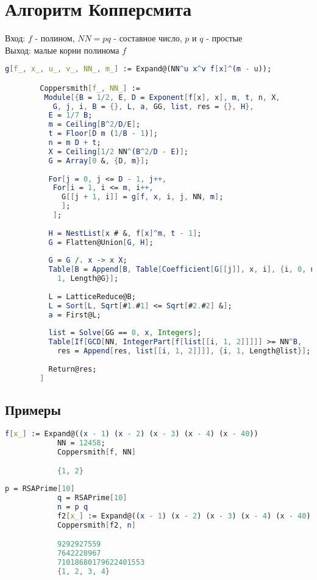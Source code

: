 	\section{Алгоритм Копперсмита}
		Вход: $f$ - полином, $NN=p q$ - составное число, $p$ и $q$ - простые \\
		Выход: малые корни полинома $f$

		\begin{lstlisting}[language=Mathematica,caption={
      		Алгоритм Копперсмита
    	}]
		g[f_, x_, u_, v_, NN_, m_] := Expand@(NN^u x^v f[x]^(m - u));

		Coppersmith[f_, NN_] := 
		 Module[{B = 1/2, E, D = Exponent[f[x], x], m, t, n, X, 
		   G, j, i, B = {}, L, a, GG, list, res = {}, H},
		  E = 1/7 B;
		  m = Ceiling[B^2/D/E];
		  t = Floor[D m (1/B - 1)];
		  n = m D + t;
		  X = Ceiling[1/2 NN^(B^2/D - E)];
		  G = Array[0 &, {D, m}];
		  
		  For[j = 0, j <= D - 1, j++,
		   For[i = 1, i <= m, i++,
		     G[[j + 1, i]] = g[f, x, i, j, NN, m];
		     ];
		   ];
		  
		  H = NestList[x # &, f[x]^m, t - 1];
		  G = Flatten@Union[G, H];
		  
		  G = G /. x -> x X;
		  Table[B = Append[B, Table[Coefficient[G[[j]], x, i], {i, 0, n - 1}]];, {j, 
		    1, Length@G}];
		  
		  L = LatticeReduce@B;
		  L = Sort[L, Sqrt[#1.#1] <= Sqrt[#2.#2] &];
		  a = First@L;
		  
		  list = Solve[GG == 0, x, Integers];
		  Table[If[GCD[NN, IntegerPart[f[list[[i, 1, 2]]]]] >= NN^B, 
		    res = Append[res, list[[i, 1, 2]]]], {i, 1, Length@list}];
		  
		  Return@res;
		]
    	\end{lstlisting}

    	\subsection{Примеры}

	    	\begin{lstlisting}[language=Mathematica,caption={
	      		Пример	1
	    	}]
			f[x_] := Expand@((x - 1) (x - 2) (x - 3) (x - 4) (x - 40))
			NN = 12458;
			Coppersmith[f, NN]

			{1, 2}
	    	\end{lstlisting}

	    	\begin{lstlisting}[language=Mathematica,caption={
	      		Пример	2
	    	}]
			p = RSAPrime[10]
			q = RSAPrime[10]
			n = p q
			f2[x_] := Expand@((x - 1) (x - 2) (x - 3) (x - 4) (x - 40) (x - 40) (x - 156) (x - 998))
			Coppersmith[f2, n]

			9292927559
			7642228967
			71018680179622401553
			{1, 2, 3, 4}
	    	\end{lstlisting}

